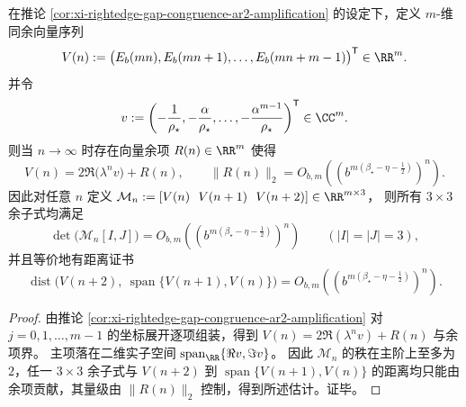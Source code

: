 \begin{proposition}[同余向量轨道的秩二刚性与超定一致性误差证书]\label{prop:xi-rightedge-gap-congruence-rank2-certificate}
在推论 \ref{cor:xi-rightedge-gap-congruence-ar2-amplification} 的设定下，定义 \(m\)-维同余向量序列
\[
V(n):=\bigl(E_b(mn),E_b(mn+1),\dots,E_b(mn+m-1)\bigr)^{\mathsf T}\in\RR^m.
\]
并令
\[
v:=\left(-\frac{1}{\rho_\star},-\frac{\alpha}{\rho_\star},\dots,-\frac{\alpha^{m-1}}{\rho_\star}\right)^{\mathsf T}\in\CC^m.
\]
则当 \(n\to\infty\) 时存在向量余项 \(R(n)\in\RR^m\) 使得
\[
\boxed{\;
V(n)=2\Re\!\bigl(\lambda^{n}v\bigr)+R(n),
\qquad
\|R(n)\|_2=O_{b,m}\!\left(\left(b^{m(\beta_\star-\eta-\frac12)}\right)^{n}\right).\;}
\]
因此对任意 \(n\) 定义
\(
\mathcal M_n:=[V(n)\ \ V(n+1)\ \ V(n+2)]\in\RR^{m\times 3}
\)，
则所有 \(3\times 3\) 余子式均满足
\[
\det\bigl(\mathcal M_n[I,J]\bigr)
=O_{b,m}\!\left(\left(b^{m(\beta_\star-\eta-\frac12)}\right)^{n}\right)
\qquad(|I|=|J|=3),
\]
并且等价地有距离证书
\[
\boxed{\;
\operatorname{dist}\bigl(V(n+2),\ \operatorname{span}\{V(n+1),V(n)\}\bigr)
=O_{b,m}\!\left(\left(b^{m(\beta_\star-\eta-\frac12)}\right)^{n}\right).\;}
\]
\end{proposition}

\begin{proof}
由推论 \ref{cor:xi-rightedge-gap-congruence-ar2-amplification} 对 \(j=0,1,\dots,m-1\) 的坐标展开逐项组装，得到
\(
V(n)=2\Re(\lambda^n v)+R(n)
\)
与余项界。
主项落在二维实子空间
\(
\operatorname{span}_{\RR}\{\Re v,\Im v\}
\)。
因此 \(\mathcal M_n\) 的秩在主阶上至多为 \(2\)，任一 \(3\times 3\) 余子式与 \(V(n+2)\) 到 \(\operatorname{span}\{V(n+1),V(n)\}\) 的距离均只能由余项贡献，其量级由 \(\|R(n)\|_2\) 控制，得到所述估计。证毕。
\end{proof}
